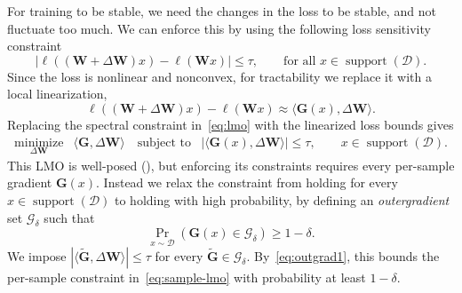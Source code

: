 \documentclass{article}
\DeclareMathOperator{\support}{support}
\newcommand{\mat}[1]{\bm{#1}}
\newcommand{\cD}{\mathcal{D}}
\newcommand{\ip}[1]{\langle #1 \rangle}
\begin{document}
For training to be stable, we need the changes in the loss to be stable, and not fluctuate too much. We can enforce this by using the following loss sensitivity constraint
\begin{equation}\label{eq:loss-diff}
     |\ell((\mat{W} +\Delta\mat{W})x) - \ell (\mat{W}x)|\leq \tau, \qquad \mbox{for all } x \in \support(\cD).
\end{equation}
Since the loss is nonlinear and nonconvex, for tractability we replace it with a local linearization,
\[
\ell((\mat{W} +\Delta\mat{W})x) -\ell (\mat{W}x)  \approx \ip{\mat{G}(x), \Delta\mat{W}}.
\] 
Replacing the spectral constraint in~\eqref{eq:lmo} with the linearized loss bounds gives
\begin{equation}
 \begin{array}{lll}
  \underset{\Delta\mat{W}}{\mathrm{minimize}} &
  \ip{\mat{G}, \Delta\mat{W}}  \quad
  \mbox{subject to} &
  \displaystyle
|\ip{\mat{G}(x), \Delta\mat{W}}|
  \le \tau, \qquad x \in \support(\cD).
  \end{array}
  \label{eq:sample-lmo}
\end{equation}
This LMO is well-posed (), but enforcing its constraints 
requires every per-sample gradient $\mat{G}(x)$. Instead we relax the constraint from holding for every $x \in \support(\cD)$ to holding with high probability, by defining an \emph{outergradient} set $\mathcal{G}_{\delta}$ such that
\begin{equation} \label{eq:outgrad1}
   \Pr_{x\sim\cD}\!\left(\mat{G}(x)\in\mathcal{G}_\delta\right)\ge 1-\delta.
\end{equation}
We impose $|\ip{\widetilde{\mat{G}},\Delta\mat{W}}|\le\tau$ for every $\widetilde{\mat{G}}\in\mathcal{G}_\delta$. 
By~\eqref{eq:outgrad1}, this bounds the per-sample constraint in~\eqref{eq:sample-lmo} with probability at least 
$1-\delta$.
\end{document}
